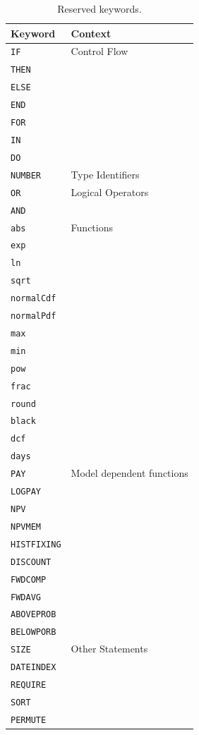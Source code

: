 \begin{table}[!htbp]
  \begin{tabular}{l | l}
    Keyword & Context\\ \hline
    \verb+IF+ & Control Flow \\
    \verb+THEN+ & \\
    \verb+ELSE+ & \\
    \verb+END+ & \\
    \verb+FOR+ & \\
    \verb+IN+ & \\
    \verb+DO+ & \\ \hline
    \verb+NUMBER+ & Type Identifiers \\ \hline
    \verb+OR+ & Logical Operators \\
    \verb+AND+ & \\ \hline
    \verb+abs+ & Functions\\
    \verb+exp+ & \\
    \verb+ln+ & \\
    \verb+sqrt+ & \\
    \verb+normalCdf+ & \\
    \verb+normalPdf+ & \\
    \verb+max+ & \\
    \verb+min+ & \\
    \verb+pow+ & \\
    \verb+frac+ & \\
    \verb+round+ & \\
    \verb+black+ & \\
    \verb+dcf+ & \\
    \verb+days+ & \\ \hline
    \verb+PAY+ & Model dependent functions\\
    \verb+LOGPAY+ & \\
    \verb+NPV+ & \\
    \verb+NPVMEM+ & \\
    \verb+HISTFIXING+ & \\
    \verb+DISCOUNT+ & \\
    \verb+FWDCOMP+ & \\
    \verb+FWDAVG+ & \\
    \verb+ABOVEPROB+ & \\
    \verb+BELOWPORB+ & \\ \hline
    \verb+SIZE+ & Other Statements \\
    \verb+DATEINDEX+ & \\
    \verb+REQUIRE+ & \\
    \verb+SORT+ & \\
    \verb+PERMUTE+ & \\
  \end{tabular}
  \caption{Reserved keywords.}
  \label{tab:keywords}
\end{table}

